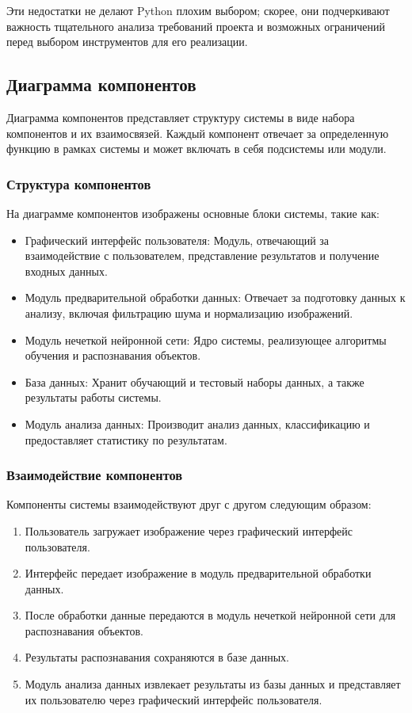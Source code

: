 Эти недостатки не делают Python плохим выбором; скорее, они подчеркивают важность тщательного анализа требований проекта и возможных ограничений перед выбором инструментов для его реализации.

\subsection{Диаграмма компонентов}

Диаграмма компонентов представляет структуру системы в виде набора компонентов и их взаимосвязей. Каждый компонент отвечает за определенную функцию в рамках системы и может включать в себя подсистемы или модули.

\subsubsection{Структура компонентов}
На диаграмме компонентов изображены основные блоки системы, такие как:

\begin{itemize}
\item Графический интерфейс пользователя: Модуль, отвечающий за взаимодействие с пользователем, представление результатов и получение входных данных.
\item Модуль предварительной обработки данных: Отвечает за подготовку данных к анализу, включая фильтрацию шума и нормализацию изображений.
\item Модуль нечеткой нейронной сети: Ядро системы, реализующее алгоритмы обучения и распознавания объектов.
\item База данных: Хранит обучающий и тестовый наборы данных, а также результаты работы системы.
\item Модуль анализа данных: Производит анализ данных, классификацию и предоставляет статистику по результатам.
\end{itemize}

\subsubsection{Взаимодействие компонентов}
Компоненты системы взаимодействуют друг с другом следующим образом:

\begin{enumerate}
\item Пользователь загружает изображение через графический интерфейс пользователя.
\item Интерфейс передает изображение в модуль предварительной обработки данных.
\item После обработки данные передаются в модуль нечеткой нейронной сети для распознавания объектов.
\item Результаты распознавания сохраняются в базе данных.
\item Модуль анализа данных извлекает результаты из базы данных и представляет их пользователю через графический интерфейс пользователя.
\end{enumerate}


